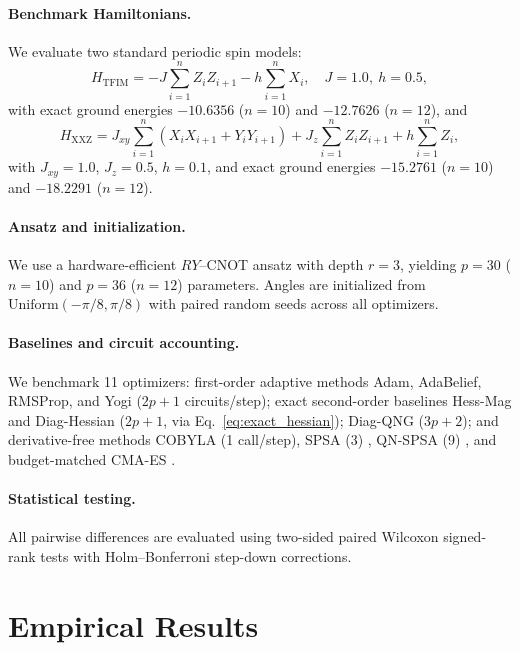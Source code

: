 \documentclass[11pt,a4paper]{article}
\begin{document}
\paragraph{Benchmark Hamiltonians.}
We evaluate two standard periodic spin models:
\begin{equation}
H_{\text{TFIM}} = -J \sum_{i=1}^n Z_i Z_{i+1} - h \sum_{i=1}^n X_i, \quad J = 1.0,\ h = 0.5,
\end{equation}
with exact ground energies $-10.6356$ ($n=10$) and $-12.7626$ ($n=12$), and
\begin{equation}
H_{\text{XXZ}} = J_{xy} \sum_{i=1}^n (X_i X_{i+1} + Y_i Y_{i+1}) + J_z \sum_{i=1}^n Z_i Z_{i+1} + h \sum_{i=1}^n Z_i,
\end{equation}
with $J_{xy}=1.0$, $J_z=0.5$, $h=0.1$, and exact ground energies $-15.2761$ ($n=10$) and $-18.2291$ ($n=12$).

\paragraph{Ansatz and initialization.}
We use a hardware-efficient $RY$--CNOT ansatz with depth $r=3$, yielding $p=30$ ($n=10$) and $p=36$ ($n=12$) parameters. Angles are initialized from $\text{Uniform}(-\pi/8, \pi/8)$ with paired random seeds across all optimizers.

\paragraph{Baselines and circuit accounting.}
We benchmark 11 optimizers: first-order adaptive methods Adam, AdaBelief, RMSProp, and Yogi ($2p+1$ circuits/step); exact second-order baselines Hess-Mag and Diag-Hessian ($2p+1$, via Eq.~\eqref{eq:exact_hessian}); Diag-QNG ($3p+2$); and derivative-free methods COBYLA (1 call/step), SPSA (3) \cite{spall1992multivariate,spall1997accelerated,spall1998implementation,spall2000adaptive}, QN-SPSA (9) \cite{gacon2021simultaneous}, and budget-matched CMA-ES \cite{novak2025benchmarking}.

\paragraph{Statistical testing.}
All pairwise differences are evaluated using two-sided paired Wilcoxon signed-rank tests with Holm--Bonferroni step-down corrections.

\FloatBarrier

\section{Empirical Results}
\label{sec:results}
\end{document}
